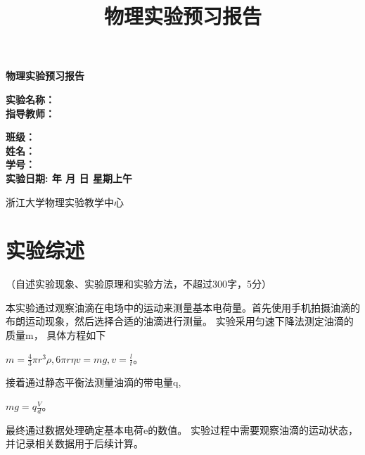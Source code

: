 \documentclass[10pt,a4paper]{ctexart}
\title{\xiaochu\textbf{物理实验预习报告}}
\author{}
\date{}
\newcommand{\myspace}[1]{\par\vspace{#1\baselineskip}} %
\newcommand{\xiaochu}{\fontsize{36pt}{42pt}\selectfont}
\newcommand{\sanhao}{\fontsize{16pt}{20pt}\selectfont}
\newcommand{\sihao}{\fontsize{14pt}{18pt}\selectfont}
\newcommand{\xiaosi}{\fontsize{12pt}{16pt}\selectfont}
\begin{document}
\vspace*{36pt} %

\begin{center}   
    \xiaochu\textbf{物理实验预习报告}
    \vspace{13pt}
    \vspace{13pt}
    \vspace{13pt}
    \vspace{13pt}
    
    \sanhao\textbf{实验名称：\underline{}} \\[10pt]
    \sanhao\textbf{指导教师：\underline{}} \\[30pt]
    
    \myspace{6}
    
   \sihao\textbf{班级：\underline{\makebox[6cm]{}}} \\[10pt]
    \sihao\textbf{姓名：\underline{\makebox[6cm]{}}} \\[10pt]
    \sihao\textbf{学号：\underline{\makebox[6cm]{}}} \\[30pt]
    
   \sihao\textbf{实验日期: 
   \underline{}  年 
   \underline{}月
   \underline{}日  
   星期\underline{}上午}
    
    \vspace{18pt}
    \sihao 浙江大学物理实验教学中心
    
\end{center}

\newpage

    \section{实验综述}
    
    \xiaosi （自述实验现象、实验原理和实验方法，不超过300字，5分）

本实验通过观察油滴在电场中的运动来测量基本电荷量。首先使用手机拍摄油滴的布朗运动现象，然后选择合适的油滴进行测量。
实验采用匀速下降法测定油滴的质量m， 具体方程如下

$m=\frac{4}{3}\pi r^3 \rho, 6\pi r \eta v = mg , v = \frac{l}{t}$。

接着通过静态平衡法测量油滴的带电量q,

$mg=q\frac{V}{d}$。

最终通过数据处理确定基本电荷e的数值。
实验过程中需要观察油滴的运动状态，并记录相关数据用于后续计算。
    
\end{document}
